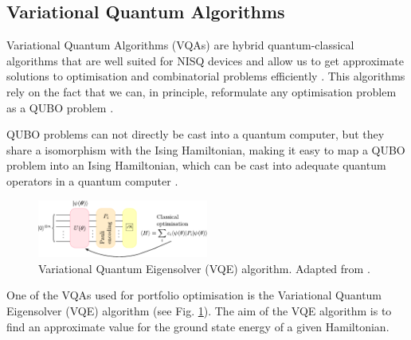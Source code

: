 \documentclass[prx,twocolumn,floatfix,superscriptaddress,longbibliography]{revtex4-1}
\begin{document}
\subsection{Variational Quantum Algorithms}
Variational Quantum Algorithms (VQAs) are hybrid quantum-classical algorithms that 
are well suited for NISQ devices and allow us to get approximate solutions to optimisation and combinatorial problems efficiently \cite{Cerezo2021}. This algorithms rely on the fact that we can, in 
principle, reformulate any optimisation problem as a QUBO problem \cite{Glover2019}.  

QUBO problems can not directly be cast into a quantum computer, but they share a isomorphism with the Ising Hamiltonian, making it easy to map a QUBO problem into an Ising Hamiltonian, which can be cast into adequate quantum operators in a quantum computer \cite{Buonaiuto2023}. 
\begin{figure}[h!]
\centering 
\includegraphics[width=0.5\textwidth]{VQE-Buonaiuto.pdf}
  \caption{\label{fig:vqe} Variational Quantum Eigensolver (VQE) algorithm. Adapted from \cite{Buonaiuto2023}.}
\end{figure}

One of the VQAs used for portfolio optimisation is the Variational Quantum Eigensolver (VQE) algorithm (see Fig. \ref{fig:vqe}). The aim of the VQE algorithm is to find an approximate value for the ground state energy of a given Hamiltonian.  
\end{document}
